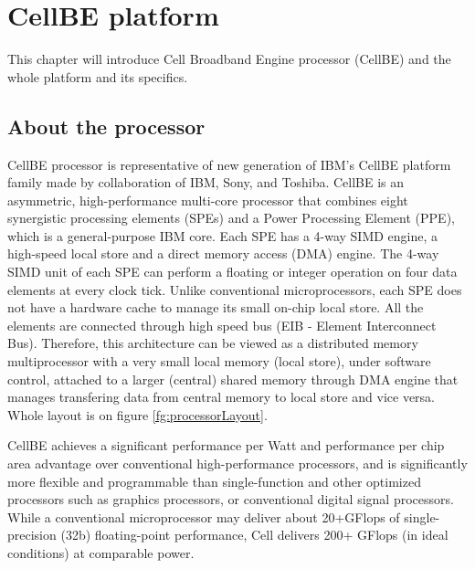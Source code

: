 \chapter{CellBE platform}

This chapter will introduce Cell Broadband Engine processor (CellBE) and the whole platform and its specifics.

\section{About the processor}

CellBE processor is representative of new generation of IBM's CellBE platform
family made by collaboration of IBM, Sony, and Toshiba. CellBE is an asymmetric,
high-performance multi-core processor that combines eight synergistic processing
elements (SPEs) and a Power Processing Element (PPE), which is a general-purpose
IBM  core. Each SPE has a 4-way SIMD engine, a
high-speed local store and a direct memory access (DMA) engine. The 4-way SIMD
unit of each SPE can perform a floating or integer operation on four data
elements at every clock tick. Unlike conventional microprocessors, each SPE does
not have a hardware cache to manage its small on-chip local store. All the
elements are connected through high speed bus (EIB - Element Interconnect Bus).
Therefore, this architecture can be viewed as a distributed memory
multiprocessor with a very small local memory (local store), under software
control, attached to a larger (central) shared memory through DMA engine that
manages transfering data from central memory to local store and vice versa.
Whole layout is on figure \ref{fg:processorLayout}.

CellBE achieves a significant performance per Watt and performance per chip area advantage over conventional high-performance processors, and is significantly more flexible and programmable than single-function and other optimized processors such as graphics processors, or conventional digital signal processors. While a conventional microprocessor may deliver about 20+GFlops of single-precision (32b) floating-point performance, Cell delivers 200+ GFlops (in ideal conditions) at comparable power.

